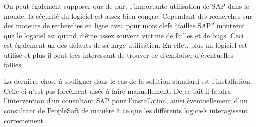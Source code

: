 On peut également supposer que de part l’importante utilisation de SAP dans le monde, la sécurité du logiciel est assez bien conçue. Cependant des recherches sur des moteurs de recherches en ligne avec pour mots clefs “failles SAP” montrent que le logiciel est quand même assez souvent victime de failles et de bugs. Ceci est également un des défauts de sa large utilisation. En effet, plus un logiciel est utilisé et plus il peut très intéressant de trouver de d’exploiter d’éventuelles failles.

La dernière chose à souligner dans  le cas de la solution standard est l’installation. Celle-ci n’est pas forcément aisée à faire manuellement. De ce fait il faudra l’intervention d’un consultant SAP pour l’installation, ainsi éventuellement d’un consultant de PeopleSoft de manière à ce que les différents logiciels interagissent correctement.